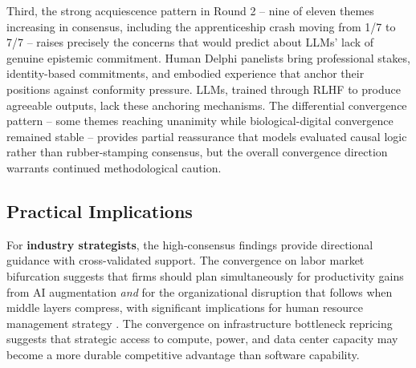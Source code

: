 \documentclass[preprint,review,12pt]{elsarticle}
\begin{document}
Third, the strong acquiescence pattern in Round 2 -- nine of eleven themes increasing in consensus, including the apprenticeship crash moving from 1/7 to 7/7 -- raises precisely the concerns that \citet{crockett2024llmparticipants} would predict about LLMs' lack of genuine epistemic commitment. Human Delphi panelists bring professional stakes, identity-based commitments, and embodied experience that anchor their positions against conformity pressure. LLMs, trained through RLHF to produce agreeable outputs, lack these anchoring mechanisms. The differential convergence pattern -- some themes reaching unanimity while biological-digital convergence remained stable -- provides partial reassurance that models evaluated causal logic rather than rubber-stamping consensus, but the overall convergence direction warrants continued methodological caution.


\subsection{Practical Implications}
\label{sec:practical_implications}

For \textbf{industry strategists}, the high-consensus findings provide directional guidance with cross-validated support. The convergence on labor market bifurcation suggests that firms should plan simultaneously for productivity gains from AI augmentation \textit{and} for the organizational disruption that follows when middle layers compress, with significant implications for human resource management strategy \citep{budhwar2023hrm}. The convergence on infrastructure bottleneck repricing suggests that strategic access to compute, power, and data center capacity may become a more durable competitive advantage than software capability.
\end{document}
